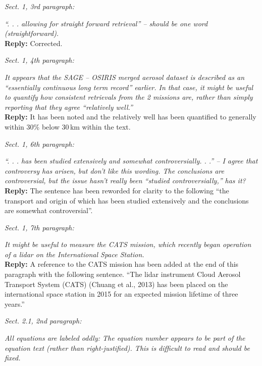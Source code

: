 \documentclass[12pt, notitlepage]{article}
\begin{document}
\textit{Sect. 1, 3rd paragraph:}

\textit{``. . . allowing for straight forward retrieval'' – should be one word (straightforward).}\\

\textbf{Reply:} Corrected.

\hrulefill

\textit{Sect. 1, 4th paragraph:}

\textit{It appears that the SAGE – OSIRIS merged aerosol dataset is described as an ``essentially
continuous long term record'' earlier. In that case, it might be useful to quantify
how consistent retrievals from the 2 missions are, rather than simply reporting that they
agree ``relatively well.''}\\

\textbf{Reply:} It has been noted and the relatively well has been quantified to generally within 30\% below 30\,km within the text.

\hrulefill

\textit{Sect. 1, 6th paragraph:}

\textit{``. . . has been studied extensively and somewhat controversially. . .'' – I agree that controversy
has arisen, but don't like this wording. The conclusions are controversial, but
the issue hasn't really been ``studied controversially,'' has it?}\\

\textbf{Reply:} The sentence has been reworded for clarity to the following ``the transport and origin of which has been
studied extensively and the conclusions are somewhat controversial''.

\hrulefill

\textit{Sect. 1, 7th paragraph:}

\textit{It might be useful to measure the CATS mission, which recently began operation of a
lidar on the International Space Station.}\\

\textbf{Reply:} A reference to the CATS mission has been added at the end of this paragraph with the following sentence. ``The lidar instrument Cloud Aerosol Transport System (CATS) (Chuang et al., 2013) has been placed on the international space station in 2015 for an expected mission lifetime of three years.''

\hrulefill

\textit{Sect. 2.1, 2nd paragraph:}

\textit{All equations are labeled oddly: The equation number appears to be part of the equation
text (rather than right-justified). This is difficult to read and should be fixed.}\\
\end{document}
